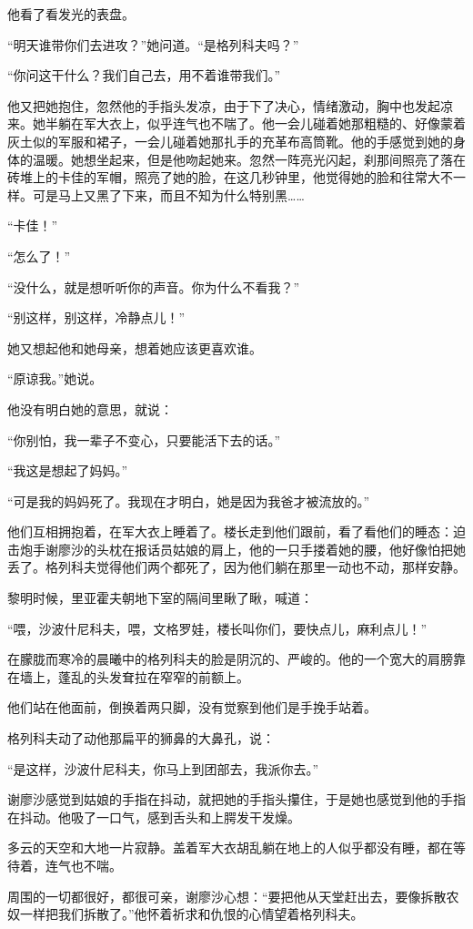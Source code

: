 他看了看发光的表盘。

“明天谁带你们去进攻？”她问道。“是格列科夫吗？”

“你问这干什么？我们自己去，用不着谁带我们。”

他又把她抱住，忽然他的手指头发凉，由于下了决心，情绪激动，胸中也发起凉来。她半躺在军大衣上，似乎连气也不喘了。他一会儿碰着她那粗糙的、好像蒙着灰土似的军服和裙子，一会儿碰着她那扎手的充革布高筒靴。他的手感觉到她的身体的温暖。她想坐起来，但是他吻起她来。忽然一阵亮光闪起，刹那间照亮了落在砖堆上的卡佳的军帽，照亮了她的脸，在这几秒钟里，他觉得她的脸和往常大不一样。可是马上又黑了下来，而且不知为什么特别黑……

“卡佳！”

“怎么了！”

“没什么，就是想听听你的声音。你为什么不看我？”

“别这样，别这样，冷静点儿！”

她又想起他和她母亲，想着她应该更喜欢谁。

“原谅我。”她说。

他没有明白她的意思，就说：

“你别怕，我一辈子不变心，只要能活下去的话。”

“我这是想起了妈妈。”

“可是我的妈妈死了。我现在才明白，她是因为我爸才被流放的。”

他们互相拥抱着，在军大衣上睡着了。楼长走到他们跟前，看了看他们的睡态：迫击炮手谢廖沙的头枕在报话员姑娘的肩上，他的一只手搂着她的腰，他好像怕把她丢了。格列科夫觉得他们两个都死了，因为他们躺在那里一动也不动，那样安静。

黎明时候，里亚霍夫朝地下室的隔间里瞅了瞅，喊道：

“喂，沙波什尼科夫，喂，文格罗娃，楼长叫你们，要快点儿，麻利点儿！”

在朦胧而寒冷的晨曦中的格列科夫的脸是阴沉的、严峻的。他的一个宽大的肩膀靠在墙上，蓬乱的头发耷拉在窄窄的前额上。

他们站在他面前，倒换着两只脚，没有觉察到他们是手挽手站着。

格列科夫动了动他那扁平的狮鼻的大鼻孔，说：

“是这样，沙波什尼科夫，你马上到团部去，我派你去。”

谢廖沙感觉到姑娘的手指在抖动，就把她的手指头攥住，于是她也感觉到他的手指在抖动。他吸了一口气，感到舌头和上腭发干发燥。

多云的天空和大地一片寂静。盖着军大衣胡乱躺在地上的人似乎都没有睡，都在等待着，连气也不喘。

周围的一切都很好，都很可亲，谢廖沙心想：“要把他从天堂赶出去，要像拆散农奴一样把我们拆散了。”他怀着祈求和仇恨的心情望着格列科夫。

